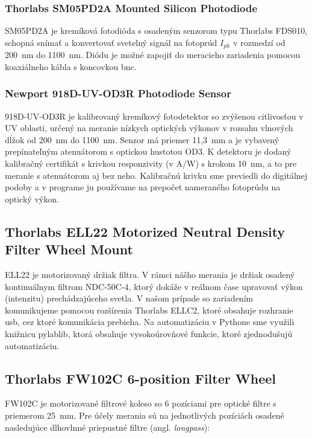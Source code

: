 \documentclass[12pt,a4paper]{article}
\begin{document}
\subsubsection{Thorlabs SM05PD2A Mounted Silicon Photodiode}
SM05PD2A je kremíková fotodióda s osadeným senzorom typu Thorlabs FDS010, schopná snímať a konvertovať svetelný signál na fotoprúd $I_{ph}$ v rozmedzí od 200~nm do 1100~nm. Diódu je možné zapojiť do meracieho zariadenia pomocou koaxiálneho kábla s koncovkou \ac{bnc}.

\newpage
\subsubsection{Newport 918D-UV-OD3R Photodiode Sensor}
918D-UV-OD3R je kalibrovaný kremíkový fotodetektor so zvýšenou citlivosťou v UV oblasti, určený na meranie nízkych optických výkonov v rozsahu vlnových dĺžok od 200~nm do 1100~nm. Senzor má priemer 11,3~mm a je vybavený prepínateľným atenuátorom s optickou hustotou OD3. K detektoru je dodaný kalibračný certifikát s krivkou responzivity (v A/W) s krokom 10~nm, a to pre meranie s atenuátorom aj bez neho. Kalibračnú krivku sme previedli do digitálnej podoby a v programe ju používame na prepočet nameraného fotoprúdu na optický výkon.

\subsection{Thorlabs ELL22 Motorized Neutral Density Filter Wheel Mount}
ELL22 je motorizovaný držiak filtra. V rámci nášho merania je držiak osadený kontinuálnym filtrom NDC-50C-4, ktorý dokáže v reálnom čase upravovať výkon (intenzitu) prechádzajúceho svetla. V našom prípade so zariadením komunikujeme pomocou rozšírenia Thorlabs ELLC2, ktoré obsahuje rozhranie \ac{usb}, cez ktoré komunikácia prebieha. Na automatizáciu v Pythone sme využili knižnicu pylablib, ktorá obsahuje vysokoúrovňové funkcie, ktoré zjednodušujú automatizáciu.

\newpage
\subsection{Thorlabs FW102C 6-position Filter Wheel}
FW102C je motorizované filtrové koleso so 6 pozíciami pre optické filtre s priemerom 25~mm. Pre účely merania sú na jednotlivých pozíciách osadené nasledujúce dlhovlnné priepustné filtre (angl. \textit{longpass}):
\end{document}
